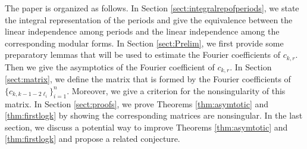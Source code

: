 \documentclass[11pt,letterpaper,reqno]{amsart}
\numberwithin{figure}{section}
\numberwithin{table}{section}
\theoremstyle{definition}
\theoremstyle{plain}
\theoremstyle{definition}
\theoremstyle{definition}
\theoremstyle{remark}
\numberwithin{equation}{section}
\theoremstyle{remark}
\begin{document}
The paper is organized as follows. In Section \ref{sect:integralrepofperiods}, we state the integral representation of the periods and give the equivalence between the linear independence among periods and the linear independence among the corresponding modular forms. In Section \ref{sect:Prelim}, we first provide some preparatory lemmas that will be used to estimate the Fourier coefficients of $c_{k,r}$.  Then we give the asymptotics of the Fourier coefficient of $c_{k,r}$. In Section \ref{sect:matrix}, we define the matrix that is formed by the Fourier coefficients of $\{c_{k,k-1-2\ell_i}\}_{i=1}^n$. Moreover, we give a criterion for the nonsingularity of this matrix. In Section \ref{sect:proofs}, we prove Theorems \ref{thm:asymtotic} and \ref{thm:firstlogk} by showing the corresponding  matrices are nonsingular. In the last section, we discuss a potential way to improve Theorems \ref{thm:asymtotic} and \ref{thm:firstlogk} and propose a related conjecture. 
\end{document}
